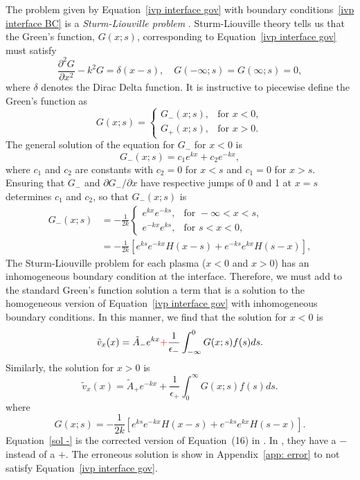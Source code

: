 \documentclass[12pt]{../style-files/ociamthesis}
\begin{document}
The problem given by Equation~\eqref{ivp interface gov} with boundary conditions~\eqref{ivp interface BC} is a \textit{Sturm-Liouville problem} \citep{boy_etal12}. Sturm-Liouville theory tells us that the Green's function, $G(x; s)$, corresponding to Equation~\eqref{ivp interface gov} must satisfy 
\begin{equation}
\frac{\partial^2G}{\partial x^2} - k^2 G = \delta(x-s), \quad G(-\infty; s) = G(\infty; s) = 0,
\end{equation}
where $\delta$ denotes the Dirac Delta function. It is instructive to piecewise define the Green's function as
\begin{equation}
G(x; s) = 
\begin{cases}
G_-(x; s), & \text{for } x < 0, \\
G_+(x; s), & \text{for } x > 0.
\end{cases}
\end{equation}
The general solution of the equation for $G_-$ for $x < 0$ is
\begin{equation}
G_-(x; s) = c_1e^{kx} + c_2e^{-kx},
\end{equation}
where $c_1$ and $c_2$ are constants with $c_2 = 0$ for $x < s$ and $c_1 = 0$ for $x > s$. Ensuring that $G_-$ and $\partial G_- / \partial x$ have respective jumps of 0 and 1 at $x = s$ determines $c_1$ and $c_2$, so that $G_-(x;s)$ is
\begin{equation}
\begin{aligned}
G_-(x; s) & = -\frac{1}{2k} 
\begin{cases}
e^{kx}e^{-ks}, & \text{for } -\infty < x < s, \\
e^{-kx}e^{ks}, & \text{for } s< x < 0,
\end{cases} \\
& = - \frac{1}{2k}\left[e^{ks}e^{-kx}H(x-s) + e^{-ks}e^{kx}H(s-x)\right],
\end{aligned}
\end{equation}
The Sturm-Liouville problem for each plasma ($x < 0$ and $x > 0$) has an inhomogeneous boundary condition at the interface. Therefore, we must add to the standard Green's function solution a term that is a solution to the homogeneous version of Equation~\eqref{ivp interface gov} with inhomogeneous boundary conditions. In this manner, we find that the solution for $x < 0$ is
\begin{equation}
\tilde{v}_x(x) = \tilde{A}_-e^{kx} \textcolor{red}{+} \frac{1}{\epsilon_-}\int_{-\infty}^{0} G(x; s) f(s) ds. \label{sol -}
\end{equation}
Similarly, the solution for $x > 0$ is
\begin{equation}
\tilde{v}_x(x) = \tilde{A}_+e^{-kx} + \frac{1}{\epsilon_+}\int_{0}^{\infty} G(x; s) f(s) ds. \label{sol +}
\end{equation}
where
\begin{equation}
G(x; s) = - \frac{1}{2k}\left[e^{ks}e^{-kx}H(x-s) + e^{-ks}e^{kx}H(s-x)\right].
\end{equation}
Equation~\eqref{sol -} is the corrected version of Equation~(16) in \cite{rae_etal81}. In \cite{rae_etal81}, they have a $-$ instead of a $+$. The erroneous solution is show in Appendix~\ref{app: error} to not satisfy Equation~\eqref{ivp interface gov}.
\end{document}
